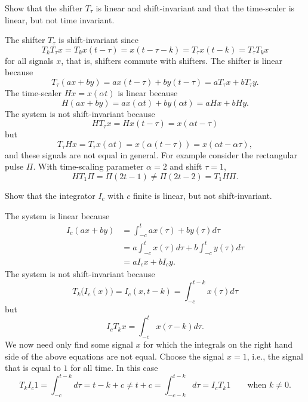\begin{excersizelist}
\item Show that the shifter $T_\tau$ is linear and shift-invariant and that the time-scaler is linear, but not time invariant.
\begin{solution}
The shifter $T_\tau$ is shift-invariant since
\[
T_kT_\tau x  = T_kx(t - \tau) = x(t - \tau - k) = T_\tau x(t - k) = T_\tau T_k x 
\]
for all signals $x$, that is, shifters commute with shifters.  The shifter is linear because
\[
T_\tau(ax + by) = ax(t - \tau) + by(t - \tau) = a T_\tau x + b T_\tau y.
\]
The time-scaler $H x = x(\alpha t)$ is linear because
\[
H(ax + by) = ax(\alpha t) + by(\alpha t) = aHx + b Hy.
\]
The system is not shift-invariant because
\[
HT_\tau x = Hx(t-\tau) = x(\alpha t - \tau)
\]
but 
\[
T_\tau H x = T_\tau x(\alpha t) = x(\alpha(t - \tau)) = x( \alpha t - \alpha \tau ),
\]
and these signals are not equal in general.  For example consider the rectangular pulse $\Pi$.  With time-scaling parameter $\alpha = 2$ and shift $\tau = 1$,
\[
H T_1 \Pi = \Pi( 2 t - 1 ) \neq \Pi( 2t - 2 ) = T_1 H \Pi .
\]
\end{solution}


\item Show that the integrator $I_c$ with $c$ finite is linear, but not shift-invariant.
\begin{solution}
The system is linear because
\begin{align*}
I_c(ax + by) &= \int_{-c}^t ax(\tau) + b y(\tau) d\tau \\
&= a\int_{-c}^t x(\tau) d\tau + b \int_{-c}^t y(\tau) d\tau \\
&= a I_c x  + b I_c y.
\end{align*}
The system is not shift-invariant because
\[
T_k\big(I_c(x)\big) = I_c(x,t-k) = \int_{-c}^{t-k} x(\tau) d\tau 
\]
but
\[
I_c T_k x = \int_{-c}^{t} x(\tau-k) d\tau.
\]
We now need only find some signal $x$ for which the integrals on the right hand side of the above equations are not equal.  Choose the signal $x = 1$, i.e., the signal that is equal to $1$ for all time.  In this case
\[
T_k I_c 1 = \int_{-c}^{t-k} d\tau =  t-k+c \neq t + c = \int_{-c-k}^{t-k} d\tau = I_c T_k 1 \qquad \text{when $k \neq 0$.}
\]
\end{solution}


\end{excersizelist}
